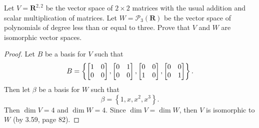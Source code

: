Let $V= \mathbf{R}^{2,2}$ be the vector space of $2 \times 2$ matrices with the usual addition and scalar multiplication of matrices.  Let $W = \mathcal{P}_3(\mathbf{R})$ be the vector space of polynomials of degree less than or equal to three.  Prove that $V$ and $W$ are isomorphic vector spaces.
\begin{mybox}
\begin{proof}
    Let $B$ be a basis for $V$ such that
    $$B = \left\{ 
        \begin{bmatrix}{1} & {0}\\{0}&{0}\end{bmatrix},
        \begin{bmatrix}{0} & {1}\\{0}&{0}\end{bmatrix},
        \begin{bmatrix}{0} & {0}\\{1}&{0}\end{bmatrix},
        \begin{bmatrix}{0} & {0}\\{0}&{1}\end{bmatrix}
     \right\}.$$
     Then let $\beta$ be a basis for $W$ such that
     $$\beta = \left\{ 
        1,
        x,
        x^2,
        x^3
     \right\}.$$
     Then $\dim V = 4$ and $\dim W = 4$. Since $\dim V = \dim W$, then $V$ is isomorphic to $W$ (by 3.59, page 82).
\end{proof}
\end{mybox}